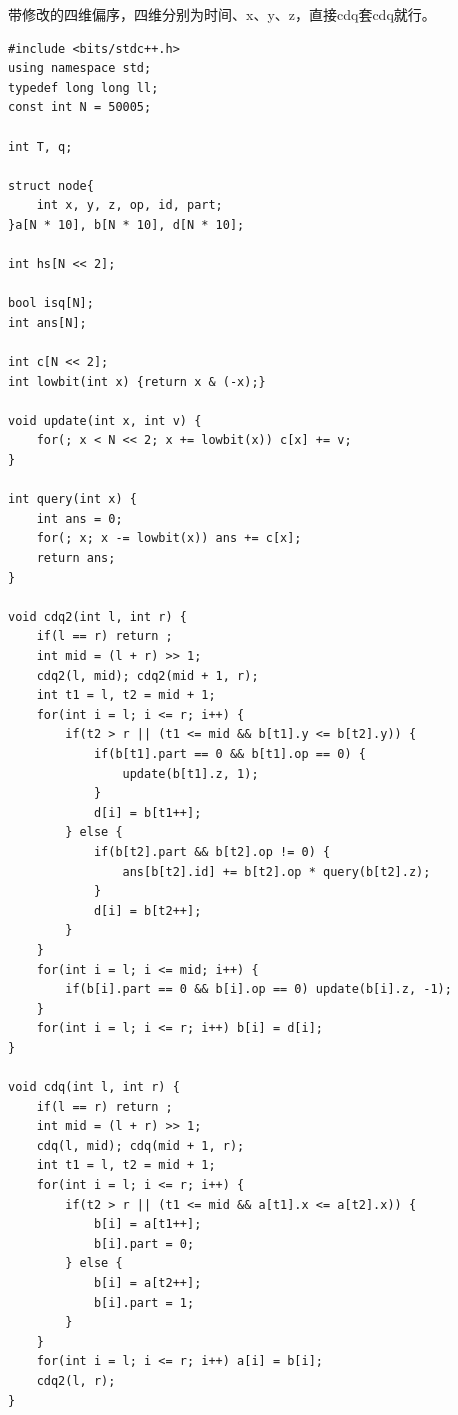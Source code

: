 \documentclass[a4paper,11pt,twoside,fontset = fandol,UTF8]{ctexbook} %
\begin{document}
	带修改的四维偏序，四维分别为时间、x、y、z，直接cdq套cdq就行。
	\begin{lstlisting}
#include <bits/stdc++.h>
using namespace std;
typedef long long ll;
const int N = 50005;

int T, q;

struct node{
    int x, y, z, op, id, part;
}a[N * 10], b[N * 10], d[N * 10];

int hs[N << 2];

bool isq[N];
int ans[N];

int c[N << 2];
int lowbit(int x) {return x & (-x);}

void update(int x, int v) {
    for(; x < N << 2; x += lowbit(x)) c[x] += v;
}

int query(int x) {
    int ans = 0;
    for(; x; x -= lowbit(x)) ans += c[x];
    return ans;
}

void cdq2(int l, int r) {
    if(l == r) return ;
    int mid = (l + r) >> 1;
    cdq2(l, mid); cdq2(mid + 1, r);
    int t1 = l, t2 = mid + 1;
    for(int i = l; i <= r; i++) {
        if(t2 > r || (t1 <= mid && b[t1].y <= b[t2].y)) {
            if(b[t1].part == 0 && b[t1].op == 0) {
                update(b[t1].z, 1);
            }
            d[i] = b[t1++];
        } else {
            if(b[t2].part && b[t2].op != 0) {
                ans[b[t2].id] += b[t2].op * query(b[t2].z);
            }
            d[i] = b[t2++];
        }
    }
    for(int i = l; i <= mid; i++) {
        if(b[i].part == 0 && b[i].op == 0) update(b[i].z, -1);
    }
    for(int i = l; i <= r; i++) b[i] = d[i];
}

void cdq(int l, int r) {
    if(l == r) return ;
    int mid = (l + r) >> 1;
    cdq(l, mid); cdq(mid + 1, r);
    int t1 = l, t2 = mid + 1;
    for(int i = l; i <= r; i++) {
        if(t2 > r || (t1 <= mid && a[t1].x <= a[t2].x)) {
            b[i] = a[t1++];
            b[i].part = 0;
        } else {
            b[i] = a[t2++];
            b[i].part = 1;
        }
    }
    for(int i = l; i <= r; i++) a[i] = b[i];
    cdq2(l, r);
}


\end{lstlisting}
\end{document}
